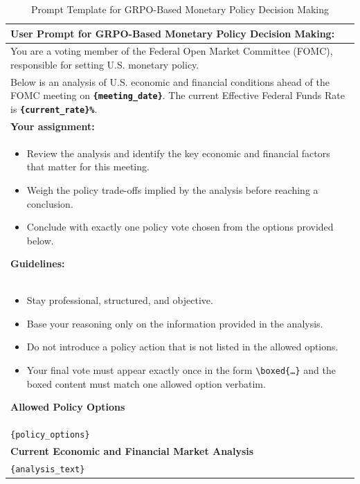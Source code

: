 \begin{table}[h]
    \centering
    \footnotesize
    \begin{tabular}{p{}}
    \toprule
    \textbf{User Prompt for GRPO-Based Monetary Policy Decision Making:} \\
    \midrule
    You are a voting member of the Federal Open Market Committee (FOMC), responsible for setting U.S. monetary policy. \\

    Below is an analysis of U.S. economic and financial conditions ahead of the FOMC meeting on \textbf{\texttt{\{meeting\_date\}}}. The current Effective Federal Funds Rate is \textbf{\texttt{\{current\_rate\}\%}}. \\

    \textbf{Your assignment:} \\
    \begin{itemize}
        \item Review the analysis and identify the key economic and financial factors that matter for this meeting.
        \item Weigh the policy trade-offs implied by the analysis before reaching a conclusion.
        \item Conclude with exactly one policy vote chosen from the options provided below.
    \end{itemize}

    \textbf{Guidelines:} \\
    \begin{itemize}
        \item Stay professional, structured, and objective.
        \item Base your reasoning only on the information provided in the analysis.
        \item Do not introduce a policy action that is not listed in the allowed options.
        \item Your final vote must appear exactly once in the form \texttt{\textbackslash boxed\{\ldots\}} and the boxed content must match one allowed option verbatim.
    \end{itemize}

    \textbf{Allowed Policy Options} \\
    \texttt{\{policy\_options\}} \\

    \textbf{Current Economic and Financial Market Analysis} \\
    \texttt{\{analysis\_text\}} \\
    \bottomrule
    \end{tabular}
    \caption{Prompt Template for GRPO-Based Monetary Policy Decision Making}
    \label{tab:ch2:decision_grpo_prompt}
\end{table}







